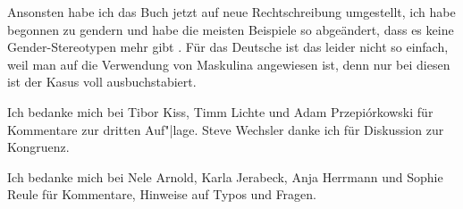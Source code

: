 Ansonsten habe ich das Buch jetzt auf neue Rechtschreibung umgestellt, ich habe begonnen zu gendern
und habe die meisten Beispiele so abgeändert, dass es keine Gender-Stereotypen mehr gibt
\citep{MB97a,PCKSDMC2017a}. Für das Deutsche ist das leider nicht so einfach, weil man auf die
Verwendung von Maskulina angewiesen ist, denn nur bei diesen ist der Kasus voll ausbuchstabiert. 

Ich bedanke mich bei Tibor Kiss, Timm Lichte und Adam
Przepiórkowski für Kommentare zur dritten Auf"|lage. Steve Wechsler
danke ich für Diskussion zur Kongruenz.

Ich bedanke mich bei Nele Arnold, Karla Jerabeck, Anja Herrmann und Sophie Reule für Kommentare, Hinweise auf Typos und Fragen.


%






%

